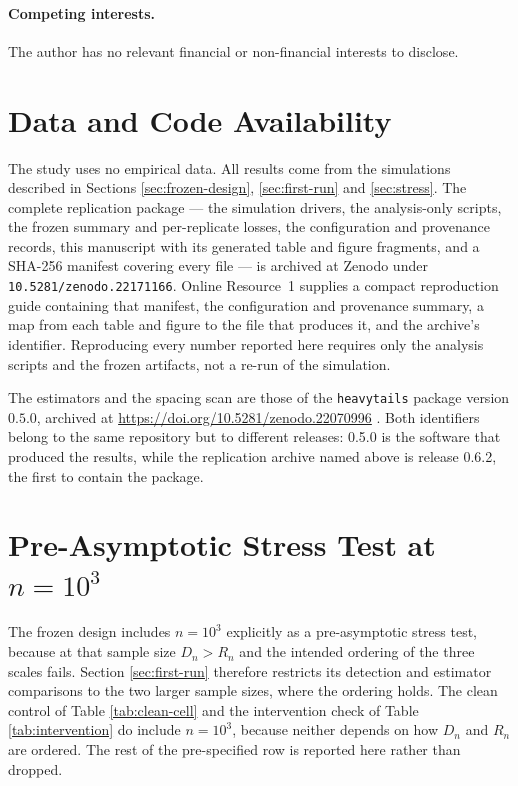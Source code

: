\documentclass[11pt]{article}
\begin{document}
\paragraph{Competing interests.}
The author has no relevant financial or non-financial interests to disclose.

\section*{Data and Code Availability}

The study uses no empirical data.  All results come from the simulations
described in Sections \ref{sec:frozen-design}, \ref{sec:first-run} and
\ref{sec:stress}.  The complete replication package --- the simulation drivers,
the analysis-only scripts, the frozen summary and per-replicate losses, the
configuration and provenance records, this manuscript with its generated table
and figure fragments, and a SHA-256 manifest covering every file --- is
archived at Zenodo under \texttt{10.5281/zenodo.22171166}.  Online Resource~1
supplies a compact reproduction guide containing that manifest, the
configuration and provenance summary, a map from each table and figure to the
file that produces it, and the archive's identifier.  Reproducing every number
reported here requires only the analysis scripts and the frozen artifacts, not
a re-run of the simulation.

The estimators and the spacing scan are those of the \texttt{heavytails}
package version $0.5.0$, archived at
\url{https://doi.org/10.5281/zenodo.22070996} \citep{heavytails-2026}.  Both
identifiers belong to the same repository but to different releases: 0.5.0 is
the software that produced the results, while the replication archive named
above is release 0.6.2, the first to contain the package.

\appendix

\section{Pre-Asymptotic Stress Test at \texorpdfstring{$n=10^3$}{n = 1000}}
\label{app:stress}

The frozen design includes $n=10^3$ explicitly as a pre-asymptotic stress test,
because at that sample size $D_n>R_n$ and the intended ordering of the three
scales fails.  Section \ref{sec:first-run} therefore restricts its detection and
estimator comparisons to the two larger sample sizes, where the ordering holds.
The clean control of Table \ref{tab:clean-cell} and the intervention check of
Table \ref{tab:intervention} do include $n=10^3$, because neither depends on
how $D_n$ and $R_n$ are ordered.  The rest of the pre-specified row is reported
here rather than dropped.
\end{document}
